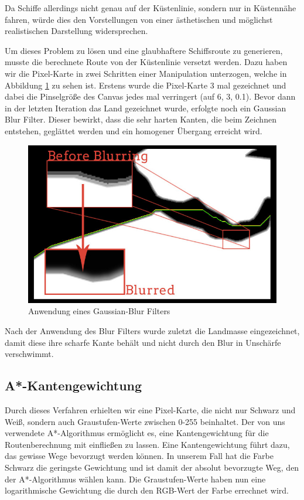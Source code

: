 \documentclass[letterpaper]{article}
\begin{document}
		Da Schiffe allerdings nicht genau auf der Küstenlinie, sondern nur in Küstennähe fahren, würde dies den Vorstellungen von einer ästhetischen und möglichst realistischen Darstellung widersprechen. 

		Um dieses Problem zu lösen und eine glaubhaftere Schiffsroute zu generieren, musste die berechnete Route von der Küstenlinie versetzt werden. Dazu haben wir die Pixel-Karte in zwei Schritten einer Manipulation unterzogen, welche in Abbildung \ref{fig:blur effect} zu sehen ist.  Erstens wurde die Pixel-Karte 3 mal gezeichnet und dabei die Pinselgröße des Canvas jedes mal verringert (auf 6, 3, 0.1). Bevor dann in der letzten Iteration das Land gezeichnet wurde, erfolgte noch ein Gaussian Blur Filter\cite{vigour17}. Dieser bewirkt, dass die sehr harten Kanten, die beim Zeichnen entstehen, geglättet werden und ein homogener Übergang erreicht wird.

		\begin{figure}[!htbp]
			\centering
			\includegraphics[width=\linewidth]{blur_effect}
			\caption{Anwendung eines Gaussian-Blur Filters}
			\label{fig:blur effect}
		\end{figure}

		Nach der Anwendung des Blur Filters wurde zuletzt die Landmasse eingezeichnet, damit diese ihre scharfe Kante behält und nicht durch den Blur in Unschärfe verschwimmt. 

		\subsection{A*-Kantengewichtung}
			Durch dieses Verfahren erhielten wir eine Pixel-Karte, die nicht nur Schwarz und Weiß, sondern auch Graustufen-Werte zwischen 0-255 beinhaltet. Der von uns verwendete A*-Algorithmus\cite{ginstead14} ermöglicht es, eine Kantengewichtung für die Routenberechnung mit einfließen zu lassen. Eine Kantengewichtung führt dazu, das gewisse Wege bevorzugt werden können. In unserem Fall hat die Farbe Schwarz die geringste Gewichtung und ist damit der absolut bevorzugte Weg, den der A*-Algorithmus wählen kann. Die Graustufen-Werte haben nun eine logarithmische Gewichtung die durch den RGB-Wert der Farbe errechnet wird.\\
\end{document}
